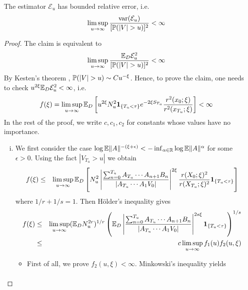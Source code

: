\documentclass{article}
\begin{document}
\begin{theorem}
  The estimator $\mathcal E_u$ has bounded relative error, i.e.
  \begin{equation*}
    \limsup_{u \to \infty} {\var(\mathcal E_u) \over [\P(|V| > u)]^2} < \infty
  \end{equation*}
\end{theorem}
\begin{proof}
  The claim is equivalent to
  \[
  \limsup_{u \to \infty} {\E_D \mathcal E_u^2 \over [\P(|V| > u)]^2} < \infty
  \]
  By Kesten's theorem \cite{Kesten1973}, $\P(|V| > u) \sim C
  u^{-\xi}$. Hence, to prove the claim, one needs to check
  $u^{2\xi}\E_D \mathcal E_u^2 < \infty$, i.e.
  \[
  f(\xi) = \limsup_{u \to \infty} \E_D  \left[u^{2\xi}
    N_u^2 \1{T_u < \tau} e^{-2\xi S_{T_u}} {r^2(x_0; \xi)
      \over r^2(x_{T_u}; \xi)}\right]
  < \infty
  \]
  In the rest of the proof, we write $c, c_1, c_2$ for constants whose values
  have no importance.
  \begin{enumerate}[(i)]
  \item We first consider the case $\log \E \|A\|^{-(\xi + \epsilon)}
    < -\inf_{\alpha \in \mathbb R} \log \E \|A\|^\alpha$ for some
    $\epsilon > 0$. Using the fact $|V_{T_u} > u|$  we obtain
    \begin{eqnarray*}
      f(\xi) &\leq& \limsup_{u \to \infty} \E_D \left[
        N_u^2  \left|
          \frac{
            \sum_{n=0}^{T_u} A_{T_u} \cdots A_{n+1} B_n 
          }{
            |A_{T_u} \cdots A_1 V_0|
          }
        \right|^{2 \xi}
        \frac{
          r(X_0; \xi)^2
        }{
          r(X_{T_u}; \xi)^2
        } \1{T_u < \tau}
      \right] \\
    \end{eqnarray*}
    where $1/r + 1/s = 1$. Then H\"older's inequality gives
    \begin{eqnarray*}
      f(\xi) &\leq& \limsup_{u \to \infty} (\E_D N_u^{2r})^{1/r}
      \left(\E_D \left|
          \frac{
            \sum_{n=0}^{T_u} A_{T_u} \cdots A_{n+1} B_n 
          }{
            |A_{T_u} \cdots A_1 V_0|
          }
        \right|^{2 s \xi} \1{T_u < \tau}
      \right)^{1/s} \\
      &\leq& c \limsup_{u \to \infty} f_1(u) f_2(u, \xi)
    \end{eqnarray*}
    \begin{itemize}
    \item First of all, we prove $f_2(u,\xi) < \infty$. Minkowski's
      inequality yields
      \begin{eqnarray*}

\end{eqnarray*}
\end{itemize}
\end{enumerate}
\end{proof}
\end{document}
